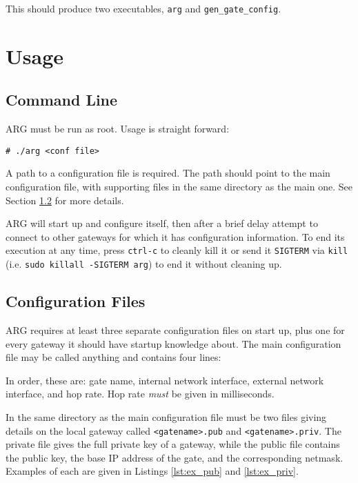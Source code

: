 \par This should produce two executables, \texttt{arg} and \texttt{gen\_gate\_config}.

\section{Usage}
\label{sec:arg_cmd}
\subsection{Command Line}
\par \ac{ARG} must be run as root. Usage is straight forward:
\begin{lstlisting}
# ./arg <conf file>
\end{lstlisting}

\par A path to a configuration file is required. The path should point to the main configuration file, with supporting files in the same directory as the main one. See Section \ref{sec:arg_conf_files} for more details.

\par \ac{ARG} will start up and configure itself, then after a brief delay attempt to connect to other gateways for which it has configuration information. To end its execution at any time, press \texttt{ctrl-c} to cleanly kill it or send it \texttt{SIGTERM} via \texttt{kill} (i.e. \lstinline{sudo killall -SIGTERM arg}) to end it without cleaning up.

\subsection{Configuration Files}
\label{sec:arg_conf_files}
\par \ac{ARG} requires at least three separate configuration files on start up, plus one for every gateway it should have startup knowledge about. The main configuration file may be called anything and contains four lines:


\par In order, these are: gate name, internal network interface, external network interface, and hop rate. Hop rate \textit{must} be given in milliseconds.

\par In the same directory as the main configuration file must be two files giving details on the local gateway called \texttt{<gatename>.pub} and \texttt{<gatename>.priv}. The private file gives the full private key of a gateway, while the public file contains the public key, the base \ac{IP} address of the gate, and the corresponding netmask. Examples of each are given in Listings \ref{lst:ex_pub} and \ref{lst:ex_priv}.



